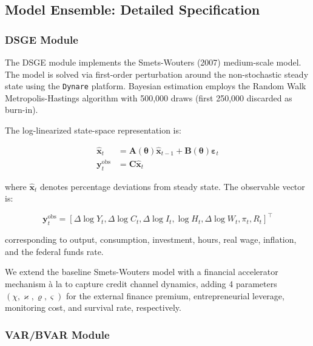 \documentclass[12pt,a4paper]{article}
\begin{document}
\subsection{Model Ensemble: Detailed Specification}

\subsubsection{DSGE Module}

The DSGE module implements the Smets-Wouters (2007) medium-scale
model.  The model is solved via first-order perturbation around the
non-stochastic steady state using the \texttt{Dynare} platform.
Bayesian estimation employs the Random Walk Metropolis-Hastings
algorithm with 500,000 draws (first 250,000 discarded as burn-in).

The log-linearized state-space representation is:

\begin{align}
    \hat{\mathbf{x}}_t &= \mathbf{A}(\boldsymbol{\theta})
    \hat{\mathbf{x}}_{t-1} + \mathbf{B}(\boldsymbol{\theta})
    \boldsymbol{\varepsilon}_t \label{eq:dsge_solved} \\
    \mathbf{y}_t^{\text{obs}} &= \mathbf{C} \hat{\mathbf{x}}_t
    \label{eq:dsge_measurement}
\end{align}

where $\hat{\mathbf{x}}_t$ denotes percentage deviations from steady
state.  The observable vector is:

\begin{equation}
    \mathbf{y}_t^{\text{obs}} = [\Delta \log Y_t, \Delta \log C_t,
    \Delta \log I_t, \log H_t, \Delta \log W_t, \pi_t, R_t]^\top
    \label{eq:dsge_obsvec}
\end{equation}

corresponding to output, consumption, investment, hours, real wage,
inflation, and the federal funds rate.

We extend the baseline Smets-Wouters model with a financial
accelerator mechanism \`{a} la \citet{bernanke1999financial} to
capture credit channel dynamics, adding 4 parameters
$(\chi, \varkappa, \varrho, \varsigma)$ for the external finance
premium, entrepreneurial leverage, monitoring cost, and survival
rate, respectively.

\subsubsection{VAR/BVAR Module}
\end{document}
